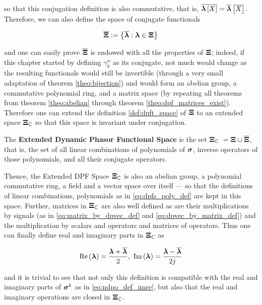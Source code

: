 	\noindent so that this conjugation definition is also commutative, that is, $\overline{\boldsymbol{\lambda}\left[X\right]} = \overline{\boldsymbol{\lambda}}\left[\overline{X}\right]$. Therefore, we can also define the space of conjugate functionals 

\begin{equation} \overline{\boldsymbol{\Xi}} \vcentcolon = \left\{\overline{\boldsymbol{\lambda}}: \boldsymbol{\lambda}\in\boldsymbol{\Xi}\right\} \end{equation}

	\noindent and one can easily prove $\overline{\boldsymbol{\Xi}}$ is endowed with all the properties of $\boldsymbol{\Xi}$; indeed, if this chapter started by defining $\gamma_k^n$ as its conjugate, not much would change as the resulting functionals would still be invertible (through a very small adaptation of theorem \ref{theo:bijection}) and would form an abelian group, a commutative polynomial ring, and a matrix space (by repeating all theorems from theorem \ref{theo:abelian} through theorem \ref{theo:dpf_matrices_exist}). Therefore one can extend the definition \ref{def:dpft_space} of $\boldsymbol{\Xi}$ to an extended space $\boldsymbol{\Xi}_\mathbb{C}$ so that this space is invariant under conjugation.

\begin{definition}\label{def:extended_dpft_space}
	The \textbf{Extended Dynamic Phasor Functional Space} is the set $\boldsymbol{\Xi}_\mathbb{C}\ = \boldsymbol{\Xi} \cup \overline{\boldsymbol{\Xi}}$, that is, the set of all linear combinations of polynomials of $\boldsymbol{\sigma}$, inverse operators of those polynomials, and all their conjugate operators.
\end{definition}

	Thence, the Extended DPF Space $\boldsymbol{\Xi}_\mathbb{C}$ is also an abelian group, a polynomial commutative ring, a field and a vector space over itself — so that the definitions of linear combinations, polynomials as in \eqref{eq:dpfs_poly_def} are kept in this space. Further, matrices in $\boldsymbol{\Xi}_\mathbb{C}$ are also well defined as are their multiplications by signals (as in \eqref{eq:matrix_by_dpvec_def} and \eqref{eq:dpvec_by_matrix_def}) and the multiplication by scalars and operators and matrices of operators. Thus one can finally define real and imaginary parts in $\boldsymbol{\Xi}_\mathbb{C}$ as

\begin{equation} \operatorname{Re}\left(\boldsymbol{\lambda}\right) = \dfrac{\boldsymbol{\lambda} + \overline{\boldsymbol{\lambda}}}{2},\ \operatorname{Im}\left(\boldsymbol{\lambda}\right) = \dfrac{\boldsymbol{\lambda} - \overline{\boldsymbol{\lambda}}}{2j} \end{equation}

	\noindent and it is trivial to see that not only this definition is compatible with the real and imaginary parts of $\boldsymbol{\sigma}^{k}$ as in \eqref{eq:ndpo_def_imre}, but also that the real and imaginary operations are closed in $\boldsymbol{\Xi}_\mathbb{C}$.

